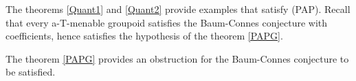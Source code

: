 \begin{rk}
The theorems \ref{Quant1} and \ref{Quant2} provide examples that satisfy (PAP). Recall that every a-T-menable groupoid satisfies the Baum-Connes conjecture with coefficients, hence satisfies the hypothesis of the theorem \ref{PAPG}.
\end{rk}

\begin{rk}
The theorem \ref{PAPG} provides an obstruction for the Baum-Connes conjecture to be satisfied. 
\end{rk}

